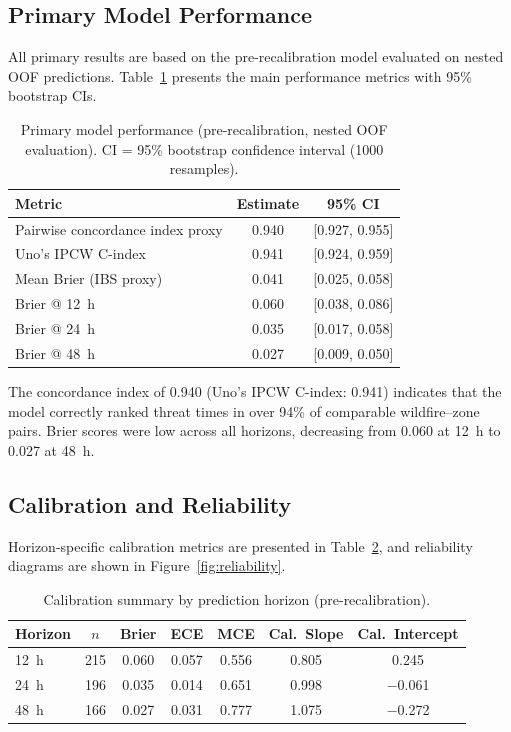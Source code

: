 \documentclass[fire,article,submit,pdftex]{../Definitions/mdpi}
\begin{document}
\subsection{Primary Model Performance}\label{sec:primary}

All primary results are based on the pre-recalibration model evaluated on nested OOF predictions.
Table~\ref{tab:primary} presents the main performance metrics with 95\% bootstrap CIs.

\begin{table}[!ht]
\caption{Primary model performance (pre-recalibration, nested OOF evaluation). CI = 95\% bootstrap confidence interval (1000 resamples).}\label{tab:primary}
\begin{tabular}{lcc}
\toprule
\textbf{Metric} & \textbf{Estimate} & \textbf{95\% CI} \\
\midrule
Pairwise concordance index proxy & 0.940 & [0.927, 0.955] \\
Uno's IPCW C-index               & 0.941 & [0.924, 0.959] \\
Mean Brier (IBS proxy)           & 0.041 & [0.025, 0.058] \\
Brier @ 12~h                     & 0.060 & [0.038, 0.086] \\
Brier @ 24~h                     & 0.035 & [0.017, 0.058] \\
Brier @ 48~h                     & 0.027 & [0.009, 0.050] \\
\bottomrule
\end{tabular}
\end{table}

The concordance index of 0.940 (Uno's IPCW C-index: 0.941) indicates that the model correctly ranked threat times in over 94\% of comparable wildfire--zone pairs.
Brier scores were low across all horizons, decreasing from 0.060 at 12~h to 0.027 at 48~h.

\subsection{Calibration and Reliability}\label{sec:calibration}

Horizon-specific calibration metrics are presented in Table~\ref{tab:calibration}, and reliability diagrams are shown in Figure~\ref{fig:reliability}.

\begin{table}[!ht]
\caption{Calibration summary by prediction horizon (pre-recalibration).}\label{tab:calibration}
\begin{tabular}{lcccccc}
\toprule
\textbf{Horizon} & $n$ & \textbf{Brier} & \textbf{ECE} & \textbf{MCE} & \textbf{Cal.\ Slope} & \textbf{Cal.\ Intercept} \\
\midrule
12~h & 215 & 0.060 & 0.057 & 0.556 & 0.805 & 0.245 \\
24~h & 196 & 0.035 & 0.014 & 0.651 & 0.998 & $-$0.061 \\
48~h & 166 & 0.027 & 0.031 & 0.777 & 1.075 & $-$0.272 \\
\bottomrule
\end{tabular}
\end{table}
\end{document}
